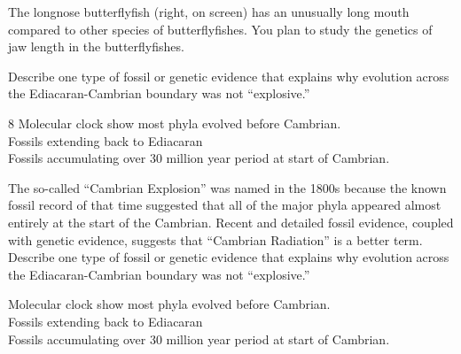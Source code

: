 
\question[7]
The longnose butterflyfish (right, on screen) has an unusually long mouth compared to other species of butterflyfishes. You plan to study the genetics of jaw length in the butterflyfishes.  



\question[5]
Describe one type of fossil or genetic evidence that explains why evolution across the Ediacaran-Cambrian boundary was not ``explosive.''


	\begin{AnswerPage}{8\baselineskip}
		Molecular clock show most phyla evolved before Cambrian.\\
		Fossils extending back to Ediacaran\\
		Fossils accumulating over 30 million year period at start of Cambrian.
	\end{AnswerPage}	


\question[5]
The so-called ``Cambrian Explosion'' was named in the 1800s because the known fossil record of that time suggested that all of the major phyla appeared almost entirely at the start of the Cambrian. Recent and detailed fossil evidence, coupled with genetic evidence, suggests that ``Cambrian Radiation'' is a better term.  Describe one type of fossil or genetic evidence that explains why evolution across the Ediacaran-Cambrian boundary was not ``explosive.'' 
	\begin{solution}
	Molecular clock show most phyla evolved before Cambrian.\\
	Fossils extending back to Ediacaran\\
	Fossils accumulating over 30 million year period at start of Cambrian.
	\end{solution}	

